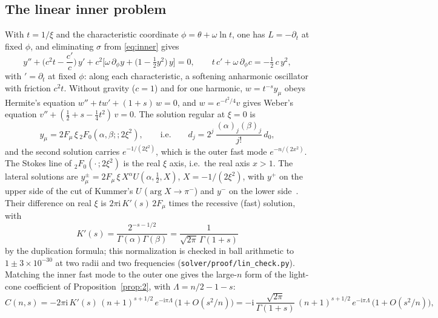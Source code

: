 \documentclass{amsart}
\numberwithin{equation}{section}
\theoremstyle{plain}
\theoremstyle{definition}
\theoremstyle{remark}
\newcommand{\iu}{\mathrm{i}}
\newcommand{\repo}[1]{\texttt{#1}}
\begin{document}
\subsection{The linear inner problem}
With $t = 1/\xi$ and the characteristic coordinate $\phi = \theta + \omega\ln t$, one has $L = -\partial_t$ at fixed
$\phi$, and eliminating $\sigma$ from \eqref{eq:inner} gives
\begin{equation}\label{eq:oscillator}
y'' + \Big(c^2t - \frac{c'}{c}\Big)\,y' + c^2\Big[\omega\,\partial_\phi y + \big(1 - \tfrac12 y^2\big)\,y\Big] = 0,
\qquad t\,c' + \omega\,\partial_\phi c = -\tfrac12\,c\,y^2,
\end{equation}
with $' = \partial_t$ at fixed $\phi$: along each characteristic, a softening anharmonic oscillator with friction $c^2t$.
Without gravity ($c = 1$) and for one harmonic, $w = t^{-s}y_\mu$ obeys Hermite's equation $w'' + tw' + (1+s)\,w = 0$, and
$w = e^{-t^2/4}v$ gives Weber's equation $v'' + (\tfrac12 + s - \tfrac14t^2)\,v = 0$. The solution regular at $\xi = 0$ is
\begin{equation}\label{eq:2F0}
y_\mu = 2F_\mu\,\xi\,{}_2F_0(\alpha,\beta;;2\xi^2),\qquad\text{i.e.}\qquad d_j = 2^j\,\frac{(\alpha)_j(\beta)_j}{j!}\,d_0 ,
\end{equation}
and the second solution carries $e^{-1/(2\xi^2)}$, which is the outer fast mode $e^{-n/(2x^2)}$. The Stokes line of
${}_2F_0(\cdot\,;2\xi^2)$ is the real $\xi$ axis, i.e.\ the real axis $x > 1$. The lateral solutions are
$y^\pm_\mu = 2F_\mu\,\xi\,X^{\alpha}U(\alpha,\tfrac12,X)$, $X = -1/(2\xi^2)$, with $y^+$ on the upper side of the cut of
Kummer's $U$ ($\arg X \to \pi^-$) and $y^-$ on the lower side~\cite[\S\S2.11, 13.7]{DLMF}. Their difference on real
$\xi$ is $2\pi\iu\,K'(s)\,2F_\mu$ times the recessive (fast) solution, with
\begin{equation}\label{eq:Kprime}
K'(s) = \frac{2^{-s-1/2}}{\Gamma(\alpha)\Gamma(\beta)} = \frac{1}{\sqrt{2\pi}\,\Gamma(1+s)}
\end{equation}
by the duplication formula; this normalization is checked in ball arithmetic to $1 \pm 3\times10^{-30}$ at two radii and
two frequencies (\repo{solver/proof/lin\_check.py}). Matching the inner fast mode to the outer one gives the large-$n$
form of the light-cone coefficient of Proposition~\ref{prop:2}, with $\Lambda = n/2 - 1 - s$:
\begin{equation}\label{eq:Clarge}
C(n,s) = -2\pi\iu\,K'(s)\,(n+1)^{s+1/2}\,e^{-\iu\pi\Lambda}\,\big(1 + O(s^2/n)\big)
= -\iu\,\frac{\sqrt{2\pi}}{\Gamma(1+s)}\,(n+1)^{s+1/2}\,e^{-\iu\pi\Lambda}\,\big(1 + O(s^2/n)\big),
\end{equation}
\end{document}

